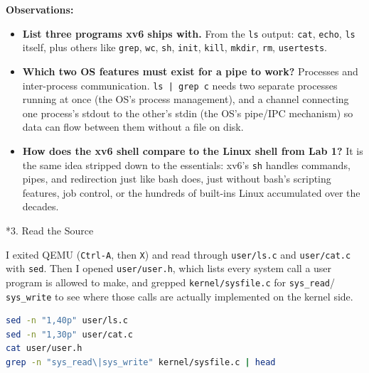 \documentclass[12pt,a4paper]{article}
\makeatletter
\renewcommand\subsection{\@startsection{subsection}{2}{0pt}{12pt}{5pt}{\normalfont\large\bfseries}}
\makeatother
\begin{document}
\noindent\textbf{Observations:}
\begin{itemize}
  \item \textbf{List three programs xv6 ships with.} From the \texttt{ls}
        output: \texttt{cat}, \texttt{echo}, \texttt{ls} itself, plus others
        like \texttt{grep}, \texttt{wc}, \texttt{sh}, \texttt{init},
        \texttt{kill}, \texttt{mkdir}, \texttt{rm}, \texttt{usertests}.
  \item \textbf{Which two OS features must exist for a pipe to work?}
        Processes and inter-process communication. \texttt{ls | grep c} needs
        two separate processes running at once (the OS's process management),
        and a channel connecting one process's stdout to the other's stdin (the
        OS's pipe/IPC mechanism) so data can flow between them without a file
        on disk.
  \item \textbf{How does the xv6 shell compare to the Linux shell from Lab 1?}
        It is the same idea stripped down to the essentials: xv6's \texttt{sh}
        handles commands, pipes, and redirection just like bash does, just
        without bash's scripting features, job control, or the hundreds of
        built-ins Linux accumulated over the decades.
\end{itemize}

\subsection*{3. Read the Source}

\hspace{0.8cm} I exited QEMU (\texttt{Ctrl-A}, then \texttt{X}) and read through
\texttt{user/ls.c} and \texttt{user/cat.c} with \texttt{sed}. Then I opened
\texttt{user/user.h}, which lists every system call a user program is allowed
to make, and grepped \texttt{kernel/sysfile.c} for \texttt{sys\_read}/
\texttt{sys\_write} to see where those calls are actually implemented on the
kernel side.

\par\noindent\begin{minipage}{\linewidth}
\begin{lstlisting}[language=bash, caption={Commands run to read the xv6 source}]
sed -n "1,40p" user/ls.c
sed -n "1,30p" user/cat.c
cat user/user.h
grep -n "sys_read\|sys_write" kernel/sysfile.c | head
\end{lstlisting}
\end{minipage}\par
\end{document}
